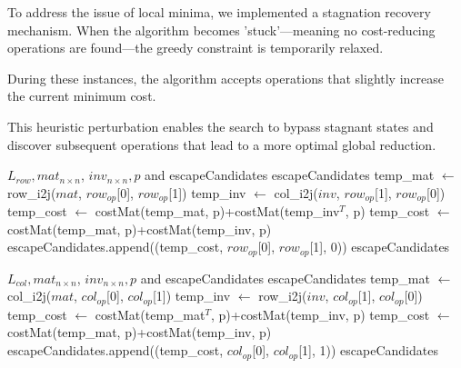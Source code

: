 To address the issue of local minima, we implemented a stagnation recovery mechanism. When the algorithm becomes 'stuck'—meaning no cost-reducing operations are found—the greedy constraint is temporarily relaxed. 

During these instances, the algorithm accepts operations that slightly increase the current minimum cost. 

This heuristic perturbation enables the search to bypass stagnant states and discover subsequent operations that lead to a more optimal global reduction.

\begin{algorithm}
\caption{avoidLocalMinimaRowOperatorSelection}
\begin{algorithmic}[1]
\Require $L_{row}, mat_{n \times n}$, $inv_{n \times n}, p$ and escapeCandidates
\Ensure escapeCandidates
	\State temp\_mat $\leftarrow$ row\_i2j($mat$, $row_{op}$[0], $row_{op}$[1])
	\State temp\_inv $\leftarrow$ col\_i2j($inv$, $row_{op}$[1], $row_{op}$[0])
		\State temp\_cost $\leftarrow$ costMat(temp\_mat, p)+costMat(temp\_inv$^{T}$, p)
	\Else
		\State temp\_cost $\leftarrow$ costMat(temp\_mat, p)+costMat(temp\_inv, p)
	\EndIf
	\State escapeCandidates.append((temp\_cost, $row_{op}$[0], $row_{op}$[1], 0))
\EndFor
\State \Return escapeCandidates
\end{algorithmic}
\end{algorithm}

\begin{algorithm}
\caption{avoidLocalMinimaColOperatorSelection}
\begin{algorithmic}[1]
\Require $L_{col}, mat_{n \times n}$, $inv_{n \times n}, p$ and escapeCandidates
\Ensure escapeCandidates
	\State temp\_mat $\leftarrow$ col\_i2j($mat$, $col_{op}$[0], $col_{op}$[1])
	\State temp\_inv $\leftarrow$ row\_i2j($inv$, $col_{op}$[1], $col_{op}$[0])
		\State temp\_cost $\leftarrow$ costMat(temp\_mat$^{T}$, p)+costMat(temp\_inv, p)
	\Else
		\State temp\_cost $\leftarrow$ costMat(temp\_mat, p)+costMat(temp\_inv, p)
	\EndIf
	\State escapeCandidates.append((temp\_cost, $col_{op}$[0], $col_{op}$[1], 1))
\EndFor
\State \Return escapeCandidates
\end{algorithmic}
\end{algorithm}